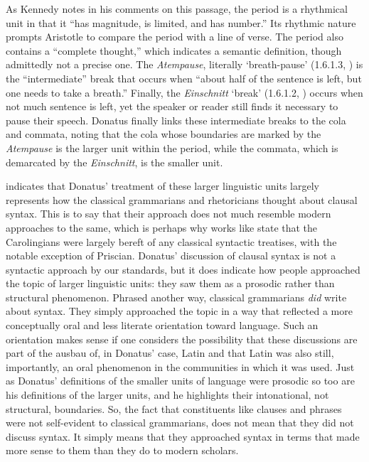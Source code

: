 \noindent As Kennedy \citep[214]{Kennedy2007} notes in his comments on this passage, the period is a rhythmical unit in that it “has magnitude, is limited, and has number.” Its rhythmic nature prompts Aristotle to compare the period with a line of verse. The period also contains a “complete thought,” which indicates a semantic definition, though admittedly not a precise one. The \textit{Atempause}, literally ‘breath-pause’ (1.6.1.3, \citealt[39]{Schönberger2010}) is the “intermediate” break that occurs when “about half of the sentence is left, but one needs to take a breath.” Finally, the \textit{Einschnitt} ‘break’ (1.6.1.2, \citealt[39]{Schönberger2010}) occurs when not much sentence is left, yet the speaker or reader still finds it necessary to pause their speech. Donatus finally links these intermediate breaks to the cola and commata, noting that the cola whose boundaries are marked by the \textit{Atempause} is the larger unit within the period, while the commata, which is demarcated by the \textit{Einschnitt}, is the smaller unit.

\begin{sloppypar}
\citet[292]{Harrison2007} indicates that Donatus’ treatment of these larger linguistic units largely represents how the classical grammarians and rhetoricians thought about clausal syntax. This is to say that their approach does not much resemble modern approaches to the same, which is perhaps why works like \citet{Luhtala1993} state that the Carolingians were largely bereft of any classical syntactic treatises, with the notable exception of Priscian. Donatus’ discussion of clausal syntax is not a syntactic approach by our standards, but it does indicate how people approached the topic of larger linguistic units: they saw them as a prosodic rather than structural phenomenon. Phrased another way, classical grammarians \textit{did} write about syntax. They simply approached the topic in a way that reflected a more conceptually oral and less literate orientation toward language. Such an orientation makes sense if one considers the possibility that these discussions are part of the ausbau of, in Donatus’ case, Latin and that Latin was also still, importantly, an oral phenomenon in the communities in which it was used. Just as Donatus’ definitions of the smaller units of language were prosodic so too are his definitions of the larger units, and he highlights their intonational, not structural, boundaries. So, the fact that constituents like clauses and phrases were not self-evident to classical grammarians, does not mean that they did not discuss syntax. It simply means that they approached syntax in terms that made more sense to them than they do to modern scholars.
\end{sloppypar}

